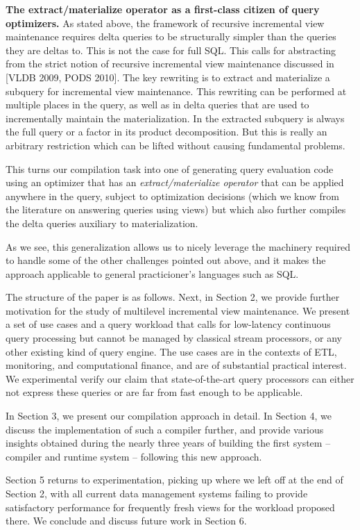 {\bf The extract/materialize operator as a first-class citizen of query optimizers.}
%
As stated above, the framework of recursive incremental view maintenance requires delta queries to be structurally simpler than the queries they are deltas to. This is not the case for full SQL. This calls for abstracting from the strict notion of recursive incremental view maintenance discussed in [VLDB 2009, PODS 2010]. The key rewriting is to extract and materialize a subquery for incremental view maintenance. This rewriting can be performed at multiple places in the query, as well as in delta queries that are used to incrementally maintain the materialization. In \cite{ahmad-vldb:09, koch-pods:10} the extracted subquery is always the full query or a factor in its product decomposition. But this is really an arbitrary restriction which can be lifted without causing fundamental problems.

This turns our compilation task into one of generating query evaluation code using an optimizer that has an {\em extract/materialize operator} that can be applied anywhere in the query, subject to optimization decisions (which we know from the literature on answering queries using views) but which also further compiles the delta queries auxiliary to materialization.

As we see, this generalization allows us to nicely leverage the machinery required to handle some of the other challenges pointed out above, and it makes the approach applicable to general practicioner's languages such as SQL.


\medskip

The structure of the paper is as follows. Next, in Section 2, we provide further motivation for the study of multilevel incremental view maintenance. We present a set of use cases and a query workload that calls for low-latency continuous query processing but cannot be managed by classical stream processors, or any other existing kind of query engine. The use cases are in the contexts of ETL, monitoring, and computational finance, and are of substantial practical interest. We experimental verify our claim that state-of-the-art query processors can either not express these queries or are far from fast enough to be applicable.

In Section 3, we present our compilation approach in detail. In Section 4, we discuss the implementation of such a compiler further, and provide various insights obtained during the nearly three years of building the first system -- compiler and runtime system -- following this new approach.

Section 5 returns to experimentation, picking up where we left off at the end of Section 2, with all current data management systems failing to provide satisfactory performance for frequently fresh views for the workload proposed there.
We conclude and discuss future work in Section 6.

